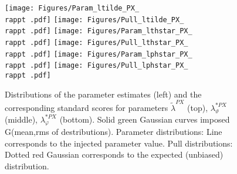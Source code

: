 \documentclass[12pt]{article}
\newcommand{\lamtildePX}{\tilde{\lambda}^{\scriptscriptstyle PX}}
\newcommand{\lamthstarPX}{\lambda^{* \scriptscriptstyle PX}_\vartheta}
\newcommand{\lamphstarPX}{\lambda^{* \scriptscriptstyle PX}_\varphi}
\providecommand{\rappt}[1]{rap1pt1}%
\begin{document}
\begin{figure}[htbp]
\centering
\texttt{[image: Figures/Param\_ltilde\_PX\_\\rappt .pdf]}
\texttt{[image: Figures/Pull\_ltilde\_PX\_\\rappt .pdf]}
\texttt{[image: Figures/Param\_lthstar\_PX\_\\rappt .pdf]}
\texttt{[image: Figures/Pull\_lthstar\_PX\_\\rappt .pdf]}
\texttt{[image: Figures/Param\_lphstar\_PX\_\\rappt .pdf]}
\texttt{[image: Figures/Pull\_lphstar\_PX\_\\rappt .pdf]}
\caption{Distributions of the parameter estimates (left) and the corresponding
standard scores for parameters $\lamtildePX$ (top), $\lamthstarPX$ (middle),
$\lamphstarPX$ (bottom). Solid green Gaussian curves imposed G(mean,rms of
destributions). Parameter distributions: Line corresponds to the injected parameter value.
Pull distributions: Dotted red Gaussian corresponds to the expected
(unbiased) distribution.}
\end{figure}
\clearpage
\end{document}
